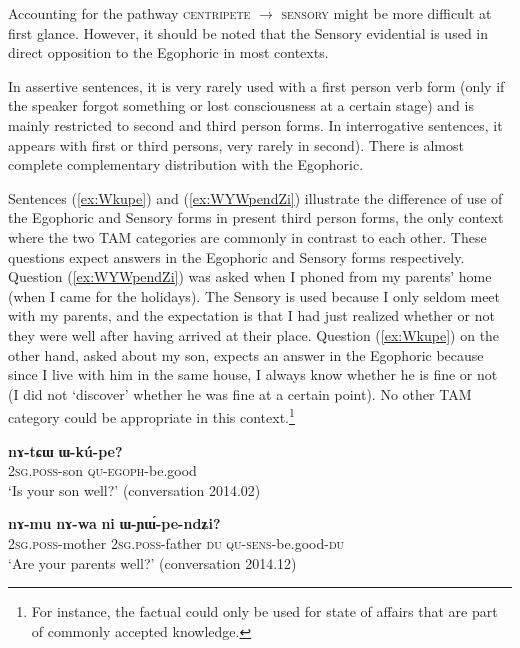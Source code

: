 \documentclass[oldfontcommands,oneside,a4paper,11pt]{article}
\newcommand{\ipa}[1]{\mbox{\phon\textbf{#1}}} %
\begin{document}
Accounting for the pathway \textsc{centripete} $\rightarrow$ \textsc{sensory} might be more difficult at first glance. However, it should be noted that the Sensory evidential is used in direct opposition to the Egophoric in most contexts. 

In assertive sentences, it is very rarely used with a first person verb form (only if the speaker forgot something or lost consciousness at a certain stage) and is mainly restricted to second and third person forms. In interrogative sentences, it appears with first or third persons, very rarely in second). There is almost complete complementary distribution with the Egophoric. 
 
Sentences (\ref{ex:Wkupe}) and (\ref{ex:WYWpendZi}) illustrate the difference of use of the Egophoric and Sensory forms in present third person forms, the only context where the two TAM categories are commonly in contrast to each other. These questions expect answers in the Egophoric and Sensory forms respectively. Question (\ref{ex:WYWpendZi}) was asked when I phoned from my parents' home (when I came for the holidays). The Sensory is used because I only seldom meet with my parents, and the expectation is that I had just realized whether or not they were well after having arrived at their place. Question (\ref{ex:Wkupe}) on the other hand, asked about my son, expects an answer in the Egophoric because since I live with him in the same house, I always know whether he is fine or not (I did not `discover' whether he was fine at a certain point). No other TAM category could be appropriate in this context.\footnote{For instance, the factual could only be used for state of affairs that are part of commonly accepted knowledge.}
 
\begin{exe}
\ex \label{ex:Wkupe}
\gll \ipa{nɤ-tɕɯ} \ipa{ɯ-kú-pe?}\\
\textsc{2sg.poss}-son \textsc{qu-egoph}-be.good\\
\glt `Is your son well?' (conversation 2014.02)
\end{exe}

\begin{exe}
\ex \label{ex:WYWpendZi}
\gll 
\ipa{nɤ-mu}  	\ipa{nɤ-wa}  	\ipa{ni}  	\ipa{ɯ-ɲɯ́-pe-ndʑi?}  \\
\textsc{2sg.poss}-mother \textsc{2sg.poss}-father \textsc{du} \textsc{qu-sens}-be.good-\textsc{du} \\
\glt `Are your parents well?' (conversation 2014.12)
\end{exe}
\end{document}
